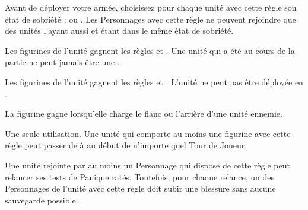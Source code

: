 \armyspecialruleentry{\drunkard}

Avant de déployer votre armée, choisissez pour chaque unité avec cette règle son état de sobriété : \sober{} ou \drunk{}. Les Personnages avec cette règle ne peuvent rejoindre que des unités l'ayant aussi et étant dans le même état de sobriété.

\begin{multicols}{2}
	\raggedcolumns
	\begin{center}{\Largerfontsize\antiquefont\sober{}}\end{center}
	\vspace{5pt}
	\textit{}\vspace{3pt}\newline
	Les figurines de l'unité gagnent les règles \vanguard{} et \lighttroops{}. Une unité qui a été \sober{} au cours de la partie ne peut jamais être une \scoringunit{}.

	\vspace*{\fill}
	\columnbreak
	\begin{center}{\Largerfontsize\antiquefont\drunk{}}\end{center}
	\vspace{5pt}
	\textit{}\vspace{3pt}\newline
	Les figurines de l'unité gagnent les règles \thunderouscharge{} et \immunetopsychology{}. L'unité ne peut pas être déployée en \ambush{}.

	\vspace*{\fill}
\end{multicols}

\armyspecialruleentry{\packtactics}

La figurine gagne \swiftstride{} lorsqu'elle charge le flanc ou l'arrière d'une unité ennemie.

\armyspecialruleentry{\lootedbooze}

Une seule utilisation. Une unité qui comporte au moins une figurine avec cette règle peut passer de \sober{} à \drunk{} au début de n'importe quel Tour de Joueur.

\armyspecialruleentry{\bloodoffering}

Une unité rejointe par au moins un Personnage qui dispose de cette règle peut relancer ses tests de Panique ratés. Toutefois, pour chaque relance, un des Personnages de l'unité avec cette règle doit subir une blessure sans aucune sauvegarde possible.

